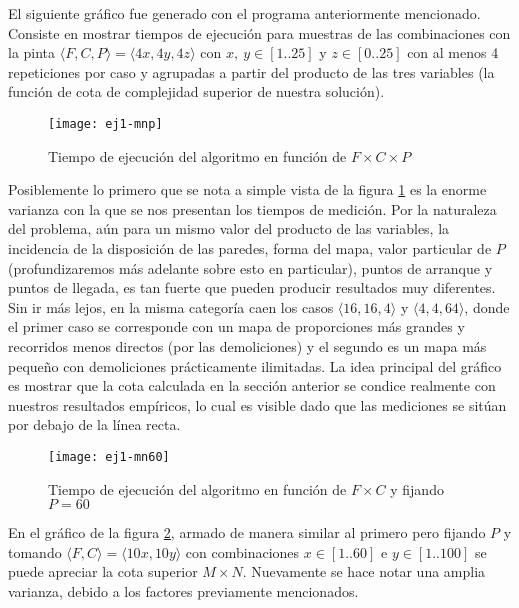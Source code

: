     El siguiente gráfico fue generado con el programa anteriormente mencionado. Consiste en mostrar tiempos de ejecución para muestras de las combinaciones con la pinta $\langle F, C, P \rangle = \langle 4x, 4y, 4z \rangle$ con $x,\ y \in [1..25]$ y $z \in [0..25]$ con al menos 4 repeticiones por caso y agrupadas a partir del producto de las tres variables (la función de cota de complejidad superior de nuestra solución).

    \begin{figure}[H]
    	\centering
    	\texttt{[image: ej1-mnp]}
    	\caption{Tiempo de ejecución del algoritmo en función de $F \times C \times P$}
    	\label{fig:ej1-mnp}
    \end{figure}

    Posiblemente lo primero que se nota a simple vista de la figura \ref{fig:ej1-mnp} es la enorme varianza con la que se nos presentan los tiempos de medición. Por la naturaleza del problema, aún para un mismo valor del producto de las variables, la incidencia de la disposición de las paredes, forma del mapa, valor particular de $P$ (profundizaremos más adelante sobre esto en particular), puntos de arranque y puntos de llegada, es tan fuerte que pueden producir resultados muy diferentes. Sin ir más lejos, en la misma categoría caen los casos $\langle 16, 16, 4 \rangle$ y $\langle 4, 4, 64 \rangle $, donde el primer caso se corresponde con un mapa de proporciones más grandes y recorridos menos directos (por las demoliciones) y el segundo es un mapa más pequeño con demoliciones prácticamente ilimitadas. La idea principal del gráfico es mostrar que la cota calculada en la sección anterior se condice realmente con nuestros resultados empíricos, lo cual es visible dado que las mediciones se sitúan por debajo de la línea recta.

    \begin{figure}[H]
    	\centering
    	\texttt{[image: ej1-mn60]}
    	\caption{Tiempo de ejecución del algoritmo en función de $F \times C$ y fijando $P=60$}
    	\label{fig:ej1-mn60}
    \end{figure}

    En el gráfico de la figura \ref{fig:ej1-mn60}, armado de manera similar al primero pero fijando $P$ y tomando $\langle {F, C} \rangle = \langle {10x, 10y} \rangle$ con combinaciones $x \in [1..60]$ e $y \in [1..100]$  se puede apreciar la cota superior $M\times N$. Nuevamente se hace notar una amplia varianza, debido a los factores previamente mencionados.
